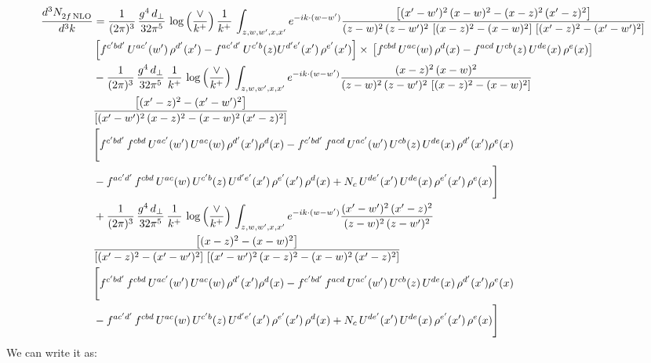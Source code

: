 \documentclass[9pt]{article}
\numberwithin{equation}{section}
\begin{document}
\begin{align}
    \frac{d^{3}N_{2f\,\rm NLO}^{\rm}}{d^{3}k}  & =  \frac{1}{(2\pi)^{3}}\, \frac{g^{4}\,d_{\perp}}{32\pi^{5}}\,\log{\left(\frac{\vee}{k^{+}}\right)}\,\frac{1}{k^{+}}\,\int_{z,w,w^{\prime},x,x'} e^{-ik\cdot (w-w')}\frac{\left[(x'-w')^{2}\, (x-w)^{2} - (x-z)^{2}\, (x'-z)^{2}\right]}{(z-w)^{2}\, (z-w')^{2}\,\left[(x-z)^{2} - (x-w)^{2}\right]\, \left[(x'-z)^{2} - (x'-w')^{2}\right]}\notag \\ &   \left[f^{c'bd'}\, U^{ac'}(w')\,\rho^{d'}(x')-f^{ac'd'}\, U^{c'b}(z)U^{d'e'}(x')\, \rho^{e'}(x')\right]\times\, \left[f^{cbd}\, U^{ac}(w)\,\rho^{d}(x) - f^{acd}\, U^{cb}(z)\,U^{de}(x)\, \rho^{e}(x)\right]  \notag \\
& - \frac{1}{(2\pi)^{3}}\, \frac{g^{4}\,d_{\perp}}{32\pi^{5}}\,\frac{1}{k^{+}}\,\log{\left(\frac{\vee}{k^{+}}\right)}\,\int_{z,w,w^{\prime},x,x'} e^{-ik\cdot (w-w')}\frac{(x-z)^{2}\, (x-w)^{2}}{(z-w)^{2}\, (z-w')^{2}\,\left[(x-z)^{2} - (x-w)^{2}\right]}\,\notag \\ & \frac{\left[(x'-z)^{2}-(x'-w')^{2}\right]}{\left[(x'-w')^{2}\, (x-z)^{2} - (x-w)^{2}\, (x'-z)^{2}\right]}\notag \\ & \Bigg[f^{c'bd'}\,f^{cbd}\, U^{ac'}(w')\,U^{ac}(w)\,\rho^{d'}(x')\rho^{d}(x)- f^{c'bd'}\,f^{acd}\,U^{ac'}(w')\,U^{cb}(z)\,U^{de}(x)\,\rho^{d'}(x')\rho^{e}(x) \notag \\ & -f^{ac'd'}\,f^{cbd}\,U^{ac}(w)\,U^{c'b}(z)\,U^{d'e'}(x')\,\rho^{e'}(x')\,\rho^{d}(x) +N_{c}\,U^{de'}(x')\,U^{de}(x)\,\rho^{e'}(x')\,\rho^{e}(x)\Bigg]  \notag \\ & + \frac{1}{(2\pi)^{3}}\, \frac{g^{4}\,d_{\perp}}{32\pi^{5}}\,\frac{1}{k^{+}}\,\log{\left(\frac{\vee}{k^{+}}\right)}\,\int_{z,w,w^{\prime},x,x'} e^{-ik\cdot (w-w')}\frac{(x'-w')^{2}\, (x'-z)^{2}}{(z-w)^{2}\, (z-w')^{2}}\notag \\ & \frac{\left[(x-z)^{2} - (x-w)^{2}\right]}{\left[(x'-z)^{2} - (x'-w')^{2}\right]\, \left[(x'-w')^{2}\, (x - z)^{2} - (x-w)^{2}\,(x'-z)^{2}\right]}\, \notag \\ &  \Bigg[f^{c'bd'}\,f^{cbd}\, U^{ac'}(w')\,U^{ac}(w)\,\rho^{d'}(x')\rho^{d}(x)- f^{c'bd'}\,f^{acd}\,U^{ac'}(w')\,U^{cb}(z)\,U^{de}(x)\,\rho^{d'}(x')\rho^{e}(x) \notag \\ & -f^{ac'd'}\,f^{cbd}\,U^{ac}(w)\,U^{c'b}(z)\,U^{d'e'}(x')\,\rho^{e'}(x')\,\rho^{d}(x) +N_{c}\,U^{de'}(x')\,U^{de}(x)\,\rho^{e'}(x')\,\rho^{e}(x)\Bigg] 
\end{align}
We can write it as:
\end{document}
